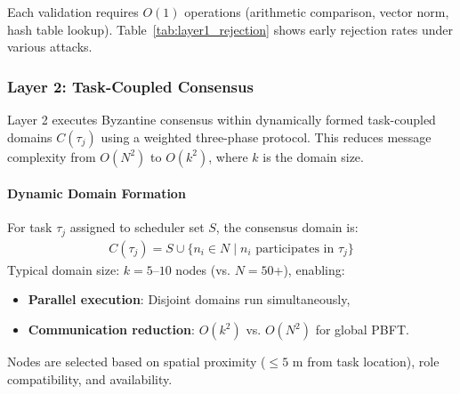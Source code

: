 \documentclass[lettersize,journal]{IEEEtran}
\begin{document}
Each validation requires $O(1)$ operations (arithmetic
comparison, vector norm, hash table lookup). Table~\ref{tab:layer1_rejection}
shows early rejection rates under various attacks.

\begin{table}[h]
\centering
\caption{Layer 1 Early Rejection Rate Under Byzantine Attacks}
\label{tab:layer1_rejection}
\small
{}
\end{table}

\subsubsection{Layer 2: Task-Coupled Consensus}
\label{sec:layer2}

Layer 2 executes Byzantine consensus within dynamically formed task-coupled
domains $C(\tau_j)$ using a weighted three-phase protocol. This reduces message
complexity from $O(N^2)$ to $O(k^2)$, where $k$ is the domain size.

\paragraph{Dynamic Domain Formation}
\label{sec:domain_formation}

For task $\tau_j$ assigned to scheduler set $S$, the consensus domain is:
\begin{equation}
\begin{aligned}
C(\tau_j) = S \cup \{n_i \in N \mid n_i \text{ participates in } \tau_j\}
\end{aligned}
\end{equation}
Typical domain size: $k = 5$--$10$ nodes (vs. $N = 50$+),
enabling:
\begin{itemize}
\item \textbf{Parallel execution}: Disjoint domains run simultaneously,
\item \textbf{Communication reduction}: $O(k^2)$ vs. $O(N^2)$ for
global PBFT.
\end{itemize}
Nodes are selected based on spatial proximity ($\leq 5$ m from
task location), role compatibility, and availability.
\end{document}
